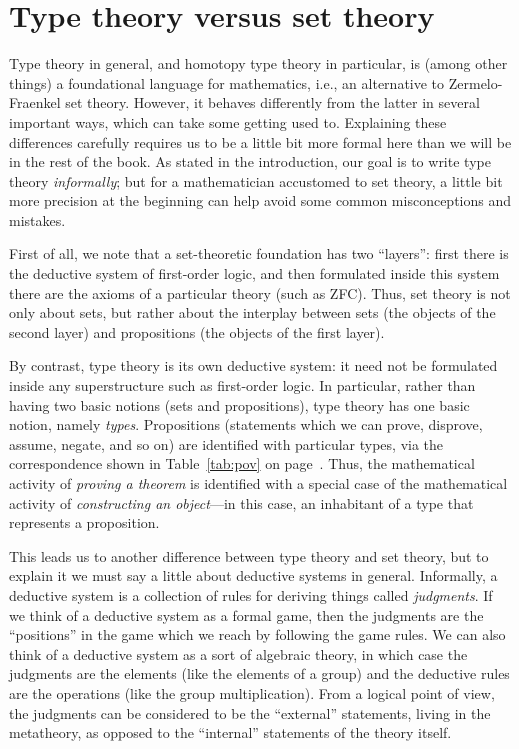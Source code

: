 {\section{Type theory versus set theory}
\label{sec:types-vs-sets}

Type theory in general, and homotopy type theory in particular, is (among other things) a foundational language for mathematics, i.e., an alternative to Zermelo-Fraenkel set theory.
However, it behaves differently from the latter in several important ways, which can take some getting used to.
Explaining these differences carefully requires us to be a little bit more formal here than we will be in the rest of the book.
As stated in the introduction, our goal is to write type theory \emph{informally}; but for a mathematician accustomed to set theory, a little bit more precision at the beginning can help avoid some common misconceptions and mistakes.

First of all, we note that a set-theoretic foundation has two ``layers'': first there is the deductive system of first-order logic, and then formulated inside this system there are the axioms of a particular theory (such as ZFC).
Thus, set theory is not only about sets, but rather about the interplay between sets (the objects of the second layer) and propositions (the objects of the first layer).

By contrast, type theory is its own deductive system: it need not be formulated inside any superstructure such as first-order logic.
In particular, rather than having two basic notions (sets and propositions), type theory has one basic notion, namely \emph{types}.
Propositions (statements which we can prove, disprove, assume, negate, and so on) are identified with particular types, via the correspondence shown in Table~\ref{tab:pov} on page~\pageref{tab:pov}.
Thus, the mathematical activity of \emph{proving a theorem} is identified with a special case of the mathematical activity of \emph{constructing an object}---in this case, an inhabitant of a type that represents a proposition.

This leads us to another difference between type theory and set theory, but to explain it we must say a little about deductive systems in general.
Informally, a deductive system is a collection of rules for deriving things called \emph{judgments}.
If we think of a deductive system as a formal game, then the judgments are the ``positions'' in the game which we reach by following the game rules.
We can also think of a deductive system as a sort of algebraic theory, in which case the judgments are the elements (like the elements of a group) and the deductive rules are the operations (like the group multiplication).
From a logical point of view, the judgments can be considered to be the ``external'' statements, living in the metatheory, as opposed to the ``internal'' statements of the theory itself.

}
